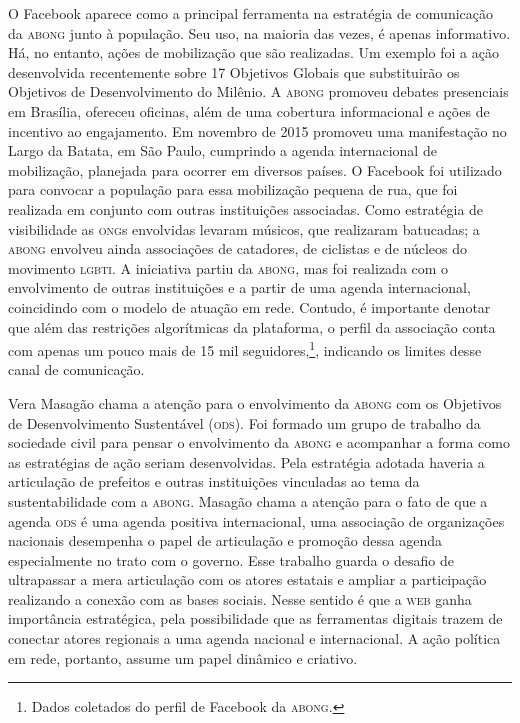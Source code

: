 O Facebook aparece como a principal ferramenta na estratégia de
comunicação da \textsc{abong} junto à população. Seu uso, na maioria das vezes, é
apenas informativo. Há, no entanto, ações de mobilização que são
realizadas. Um exemplo foi a ação desenvolvida recentemente sobre 17
Objetivos Globais que substituirão os Objetivos de Desenvolvimento do
Milênio. A \textsc{abong} promoveu debates presenciais em Brasília, ofereceu
oficinas, além de uma cobertura informacional e ações de incentivo ao
engajamento. Em novembro de 2015 promoveu uma manifestação no Largo da
Batata, em São Paulo, cumprindo a agenda internacional de mobilização,
planejada para ocorrer em diversos países. O Facebook foi utilizado para
convocar a população para essa mobilização pequena de rua, que foi
realizada em conjunto com outras instituições associadas. Como
estratégia de visibilidade as \textsc{ong}s envolvidas levaram músicos, que
realizaram batucadas; a \textsc{abong} envolveu ainda associações de catadores,
de ciclistas e de núcleos do movimento \textsc{lgbti}. A iniciativa partiu da
\textsc{abong}, mas foi realizada com o envolvimento de outras instituições e a
partir de uma agenda internacional, coincidindo com o modelo de atuação
em rede. Contudo, é importante denotar que além das restrições
algorítmicas da plataforma, o perfil da associação conta com apenas um
pouco mais de 15 mil seguidores,\footnote{Dados coletados do perfil de Facebook da \textsc{abong}.}, indicando os limites desse canal de comunicação.

Vera Masagão chama a atenção para o envolvimento da \textsc{abong} com os
Objetivos de Desenvolvimento Sustentável (\textsc{ods}). Foi formado um grupo de
trabalho da sociedade civil para pensar o envolvimento da \textsc{abong} e
acompanhar a forma como as estratégias de ação seriam desenvolvidas.
Pela estratégia adotada haveria a articulação de prefeitos e outras
instituições vinculadas ao tema da sustentabilidade com a \textsc{abong}. Masagão
chama a atenção para o fato de que a agenda \textsc{ods} é uma agenda positiva
internacional, uma associação de organizações nacionais desempenha o
papel de articulação e promoção dessa agenda especialmente no trato com
o governo. Esse trabalho guarda o desafio de ultrapassar a mera
articulação com os atores estatais e ampliar a participação realizando a
conexão com as bases sociais. Nesse sentido é que a \textsc{web} ganha
importância estratégica, pela possibilidade que as ferramentas digitais
trazem de conectar atores regionais a uma agenda nacional e
internacional. A ação política em rede, portanto, assume um papel
dinâmico e criativo.

